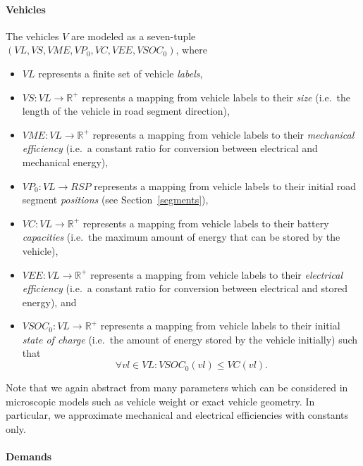 \paragraph{Vehicles}
\label{vehicles}

The vehicles $V$ are modeled as a seven-tuple $(VL, VS, VME, VP_0, VC, VEE, VSOC_0)$, where
\begin{itemize}
	\item $VL$ represents a finite set of vehicle \textit{labels},
	\item $VS: VL \rightarrow \mathbb{R}^+$ represents a mapping from vehicle labels to their \textit{size} (i.e.\ the length of the vehicle in road segment direction),
	\item $VME: VL \rightarrow \mathbb{R}^+$ represents a mapping from vehicle labels to their \textit{mechanical efficiency} (i.e.\ a constant ratio for conversion between electrical and mechanical energy),
	\item $VP_0: VL \rightarrow RSP$ represents a mapping from vehicle labels to their initial road segment \textit{positions} (see Section~\ref{segments}),
	\item $VC: VL \rightarrow \mathbb{R}^+$ represents a mapping from vehicle labels to their battery \textit{capacities} (i.e.\ the maximum amount of energy that can be stored by the vehicle),
	\item $VEE: VL \rightarrow \mathbb{R}^+$ represents a mapping from vehicle labels to their \textit{electrical efficiency} (i.e.\ a constant ratio for conversion between electrical and stored energy), and
	\item $VSOC_0: VL \rightarrow \mathbb{R}^+$ represents a mapping from vehicle labels to their initial \textit{state of charge} (i.e.\ the amount of energy stored by the vehicle initially) such that
	\[
		\forall vl \in VL : VSOC_0(vl) \leq VC(vl) \textrm{.}
	\]
\end{itemize}
Note that we again abstract from many parameters which can be considered in microscopic models such as vehicle weight or exact vehicle geometry. In particular, we approximate mechanical and electrical efficiencies with constants only.

\paragraph{Demands}
\label{demands}


